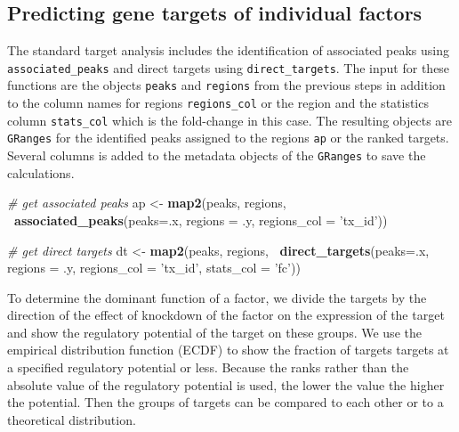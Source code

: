 \documentclass[9pt,a4paper,]{extarticle}
\newenvironment{Shaded}{\begin{snugshade}}{\end{snugshade}}
\newcommand{\CommentTok}[1]{\textcolor[rgb]{0.56,0.35,0.01}{\textit{#1}}}
\newcommand{\DataTypeTok}[1]{\textcolor[rgb]{0.13,0.29,0.53}{#1}}
\newcommand{\KeywordTok}[1]{\textcolor[rgb]{0.13,0.29,0.53}{\textbf{#1}}}
\newcommand{\NormalTok}[1]{#1}
\newcommand{\OperatorTok}[1]{\textcolor[rgb]{0.81,0.36,0.00}{\textbf{#1}}}
\newcommand{\StringTok}[1]{\textcolor[rgb]{0.31,0.60,0.02}{#1}}
\begin{document}
\hypertarget{predicting-gene-targets-of-individual-factors}{%
\subsection{Predicting gene targets of individual factors}\label{predicting-gene-targets-of-individual-factors}}

The standard target analysis includes the identification of associated peaks using \texttt{associated\_peaks} and direct targets using \texttt{direct\_targets}. The input for these functions are the objects \texttt{peaks} and \texttt{regions} from the previous steps in addition to the column names for regions \texttt{regions\_col} or the region and the statistics column \texttt{stats\_col} which is the fold-change in this case. The resulting objects are \texttt{GRanges} for the identified peaks assigned to the regions \texttt{ap} or the ranked targets. Several columns is added to the metadata objects of the \texttt{GRanges} to save the calculations.

\begin{Shaded}
\begin{Highlighting}[]
\CommentTok{# get associated peaks}
\NormalTok{ap <-}\StringTok{ }\KeywordTok{map2}\NormalTok{(peaks, regions,}
           \OperatorTok{~}\KeywordTok{associated_peaks}\NormalTok{(}\DataTypeTok{peaks=}\NormalTok{.x,}
                             \DataTypeTok{regions =}\NormalTok{ .y,}
                             \DataTypeTok{regions_col =} \StringTok{'tx_id'}\NormalTok{))}

\CommentTok{# get direct targets}
\NormalTok{dt <-}\StringTok{ }\KeywordTok{map2}\NormalTok{(peaks, regions,}
           \OperatorTok{~}\KeywordTok{direct_targets}\NormalTok{(}\DataTypeTok{peaks=}\NormalTok{.x,}
                           \DataTypeTok{regions =}\NormalTok{ .y,}
                           \DataTypeTok{regions_col =} \StringTok{'tx_id'}\NormalTok{,}
                           \DataTypeTok{stats_col =} \StringTok{'fc'}\NormalTok{))}
\end{Highlighting}
\end{Shaded}

To determine the dominant function of a factor, we divide the targets by the direction of the effect of knockdown of the factor on the expression of the target and show the regulatory potential of the target on these groups. We use the empirical distribution function (ECDF) to show the fraction of targets targets at a specified regulatory potential or less. Because the ranks rather than the absolute value of the regulatory potential is used, the lower the value the higher the potential. Then the groups of targets can be compared to each other or to a theoretical distribution.
\end{document}

